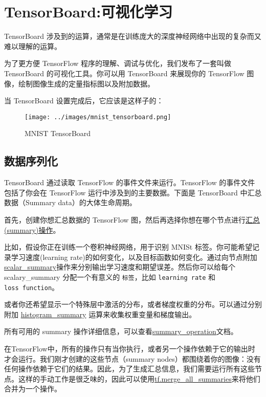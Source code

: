 

\section{TensorBoard:可视化学习　}\label{tensorboardux53efux89c6ux5316ux5b66ux4e60}

TensorBoard
涉及到的运算，通常是在训练庞大的深度神经网络中出现的复杂而又难以理解的运算。

为了更方便 TensorFlow 程序的理解、调试与优化，我们发布了一套叫做
TensorBoard 的可视化工具。你可以用 TensorBoard 来展现你的 TensorFlow
图像，绘制图像生成的定量指标图以及附加数据。

当 TensorBoard 设置完成后，它应该是这样子的：

\begin{figure}[htbp]
\centering
\texttt{[image: ../images/mnist\_tensorboard.png]}
\caption{MNIST TensorBoard}
\end{figure}

\subsection{数据序列化　}\label{ux6570ux636eux5e8fux5217ux5316}

TensorBoard 通过读取 TensorFlow 的事件文件来运行。TensorFlow
的事件文件包括了你会在 TensorFlow 运行中涉及到的主要数据。下面是
TensorBoard 中汇总数据（Summary data）的大体生命周期。

首先，创建你想汇总数据的 TensorFlow
图，然后再选择你想在哪个节点进行\href{../api_docs/python/train.md\#summary_options}{汇总(summary)操作}。

比如，假设你正在训练一个卷积神经网络，用于识别 MNISt
标签。你可能希望记录学习速度(learning
rate)的如何变化，以及目标函数如何变化。通过向节点附加\href{../api_docs/python/train.md\#scalary_summary}{scalar\_summary}操作来分别输出学习速度和期望误差。然后你可以给每个
scalary\_summary 分配一个有意义的 \texttt{标签}，比如
\texttt{\textquotesingle{}learning\ rate\textquotesingle{}} 和
\texttt{\textquotesingle{}loss\ function\textquotesingle{}}。

或者你还希望显示一个特殊层中激活的分布，或者梯度权重的分布。可以通过分别附加
\href{../api_docs/python/train.md\#histogram_summary}{histogram\_summary}
运算来收集权重变量和梯度输出。

所有可用的 summary
操作详细信息，可以查看\href{../api_docs/python/train.md\#summary_operation}{summary\_operation}文档。

在TensorFlow中，所有的操作只有当你执行，或者另一个操作依赖于它的输出时才会运行。我们刚才创建的这些节点（summary
nodes）都围绕着你的图像：没有任何操作依赖于它们的结果。因此，为了生成汇总信息，我们需要运行所有这些节点。这样的手动工作是很乏味的，因此可以使用\href{../api_docs/python/train.md\#scalary_summary}{tf.merge\_all\_summaries}来将他们合并为一个操作。

